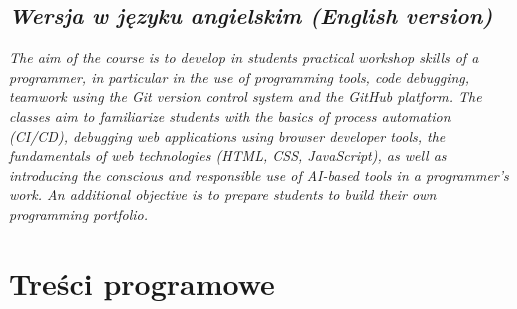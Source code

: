 \documentclass[12pt, a4paper]{article}
\begin{document}
\subsection*{\textit{Wersja w języku angielskim (English version)}}

\textit{The aim of the course is to develop in students practical workshop skills of a programmer, in particular in the use of programming tools, code debugging, teamwork using the Git version control system and the GitHub platform. The classes aim to familiarize students with the basics of process automation (CI/CD), debugging web applications using browser developer tools, the fundamentals of web technologies (HTML, CSS, JavaScript), as well as introducing the conscious and responsible use of AI-based tools in a programmer’s work. An additional objective is to prepare students to build their own programming portfolio.}


\section{Treści programowe}
\end{document}

